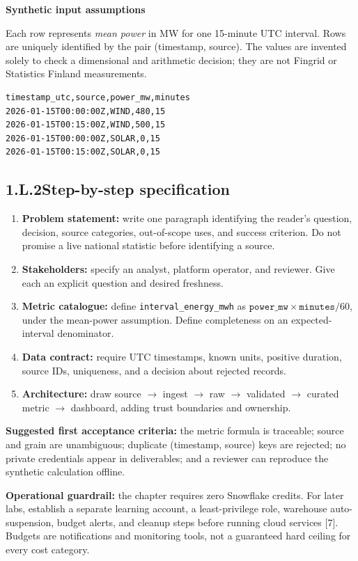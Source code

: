 \documentclass[11pt,twoside]{article}
\newcommand{\topic}[2]{\subsection*{#1\quad #2}}
\begin{document}
\begin{whitebox}
\textbf{Synthetic input assumptions}\par
Each row represents \emph{mean power} in MW for one 15-minute UTC interval. Rows are uniquely identified by the pair (timestamp, source). The values are invented solely to check a dimensional and arithmetic decision; they are not Fingrid or Statistics Finland measurements.
\end{whitebox}
\begin{lstlisting}[language={},caption={Synthetic sample for the offline lab (energy\_sample.csv).}]
timestamp_utc,source,power_mw,minutes
2026-01-15T00:00:00Z,WIND,480,15
2026-01-15T00:15:00Z,WIND,500,15
2026-01-15T00:00:00Z,SOLAR,0,15
2026-01-15T00:15:00Z,SOLAR,0,15
\end{lstlisting}
\topic{1.L.2}{Step-by-step specification}
\begin{enumerate}
\item \textbf{Problem statement:} write one paragraph identifying the reader's question, decision, source categories, out-of-scope uses, and success criterion. Do not promise a live national statistic before identifying a source.
\item \textbf{Stakeholders:} specify an analyst, platform operator, and reviewer. Give each an explicit question and desired freshness.
\item \textbf{Metric catalogue:} define \texttt{interval\_energy\_mwh} as \(\texttt{power\_mw}\times\texttt{minutes}/60\), under the mean-power assumption. Define completeness on an expected-interval denominator.
\item \textbf{Data contract:} require UTC timestamps, known units, positive duration, source IDs, uniqueness, and a decision about rejected records.
\item \textbf{Architecture:} draw source \(\rightarrow\) ingest \(\rightarrow\) raw \(\rightarrow\) validated \(\rightarrow\) curated metric \(\rightarrow\) dashboard, adding trust boundaries and ownership.
\end{enumerate}
\textbf{Suggested first acceptance criteria:} the metric formula is traceable; source and grain are unambiguous; duplicate (timestamp, source) keys are rejected; no private credentials appear in deliverables; and a reviewer can reproduce the synthetic calculation offline.

\textbf{Operational guardrail:} the chapter requires zero Snowflake credits. For later labs, establish a separate learning account, a least-privilege role, warehouse auto-suspension, budget alerts, and cleanup steps before running cloud services [7]. Budgets are notifications and monitoring tools, not a guaranteed hard ceiling for every cost category.
\end{document}
